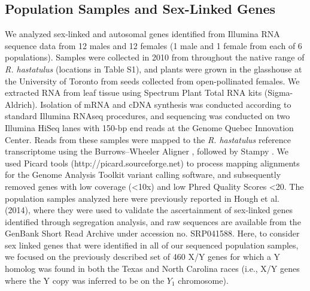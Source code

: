 \documentclass[9pt,twocolumn,twoside]{gsajnl}
\begin{document}
\subsection*{Population Samples and Sex-Linked Genes}
We analyzed sex-linked and autosomal genes identified from Illumina RNA sequence data from 12 males and 12 females (1 male and 1 female from each of 6 populations). Samples were collected in 2010 from throughout the native range of \textit{R. hastatulus} (locations in Table S1), and plants were grown in the glasshouse at the University of Toronto from seeds collected from open-pollinated females. We extracted RNA from leaf tissue using Spectrum Plant Total RNA kits (Sigma-Aldrich). Isolation of mRNA and cDNA synthesis was conducted according to standard Illumina RNAseq procedures, and sequencing was conducted on two Illumina HiSeq lanes with 150-bp end reads at the Genome Quebec Innovation Center. Reads from these samples were mapped to the \textit{R. hastatulus} reference transcriptome \citep{hough2014} using the Burrows–Wheeler Aligner \citep{li2010fast}, followed by Stampy \citep{lunter2011stampy}. We used Picard tools (http://picard.sourceforge.net) to process mapping alignments for the Genome Analysis Toolkit \citep{mckenna2010genome} variant calling software, and subsequently removed genes with low coverage (<10x) and low Phred Quality Scores <20. The population samples analyzed here were previously reported in Hough et al. (2014), where they were used to validate the ascertainment of sex-linked genes identified through segregation analysis, and raw sequences are available from the GenBank Short Read Archive under accession no. SRP041588. Here, to consider sex linked genes that were identified in all of our sequenced population samples, we focused on the previously described set of 460 X/Y genes for which a Y homolog was found in both the Texas and North Carolina races (i.e., X/Y genes where the Y copy was inferred to be on the $Y_{1}$ chromosome).
\end{document}
